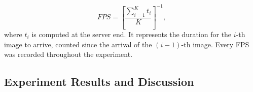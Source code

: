 \documentclass[journal]{IEEEtran}  %
\begin{document}
\begin{equation}
FPS=\left[\frac{\sum_{i=1}^K t_i}{K}\right]^{-1},
\label{:fps}
\end{equation}
where $t_i$ is computed at the server end. It represents the duration for the
  $i$-th image to arrive, counted since the arrival of the $(i-1)$-th image.
  Every FPS was recorded throughout the experiment.


\subsection{Experiment Results and Discussion}
\end{document}
